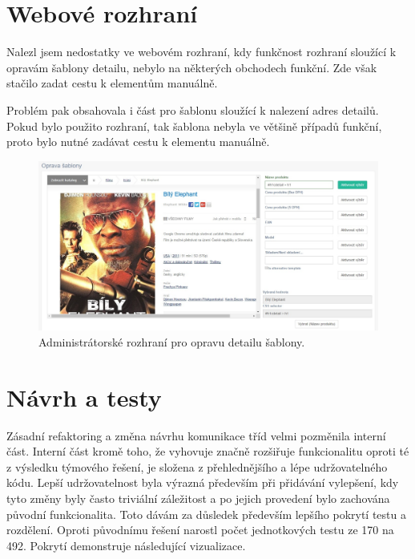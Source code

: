 \documentclass[thesis=B,czech]{FITthesis}[2012/06/26]
\begin{document}
\section{Webové rozhraní}
Nalezl jsem nedostatky ve webovém rozhraní, kdy funkčnost rozhraní sloužící k opravám šablony detailu, nebylo na některých obchodech funkční.
Zde však stačilo zadat cestu k elementům manuálně. 
\par
Problém pak obsahovala i část pro šablonu sloužící k nalezení adres detailů. Pokud bylo použito rozhraní, tak šablona nebyla ve většině
případů funkční, proto bylo nutné zadávat cestu k elementu manuálně.

\par
\begin{figure}[h]\centering
 	\includegraphics[width=1.0\textwidth]{resources/template-detail-err}
	\caption[Administrátorské rozhraní pro opravu detailu šablony]{Administrátorské rozhraní pro opravu detailu šablony.}\label{fig:temp-det-err}
\end{figure}



\section{Návrh a testy}

Zásadní refaktoring a změna návrhu komunikace tříd velmi pozměnila interní část. 
Interní část kromě toho, že vyhovuje značně rozšiřuje funkcionalitu oproti té z výsledku týmového řešení,
je složena z přehlednějšího a lépe udržovatelného kódu.
Lepší udržovatelnost byla výrazná především při přidávání vylepšení, kdy
tyto změny byly často triviální záležitost a po jejich provedení bylo zachována
původní funkcionalita. Toto dávám za důsledek především lepšího pokrytí
testu a rozdělení. Oproti původnímu řešení narostl počet jednotkových
testu ze 170 na 492. Pokrytí demonstruje následující vizualizace.
\end{document}
